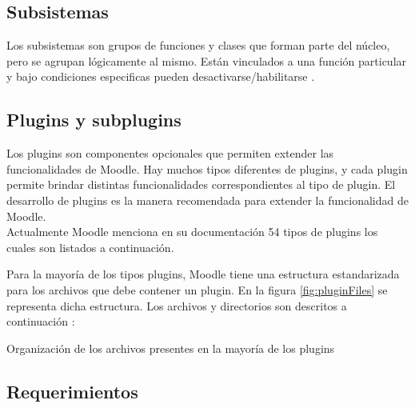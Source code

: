     \begin{multicols}{3}
        
    \end{multicols}


\subsection{Subsistemas}

 Los subsistemas son grupos de funciones y clases que forman parte del núcleo, pero se agrupan
 lógicamente al mismo. Están vinculados a una función particular y bajo condiciones especificas
 pueden desactivarse/habilitarse \cite{moodleComponets}.


\subsection{Plugins y subplugins}\label{subsec:plugins}

 Los plugins son componentes opcionales que permiten extender las funcionalidades de Moodle.
 Hay muchos tipos diferentes de plugins, y cada plugin permite brindar distintas funcionalidades
 correspondientes al tipo de plugin. El desarrollo de plugins es la manera recomendada para extender
 la funcionalidad de Moodle.\\

 \noindent Actualmente Moodle menciona en su documentación 54 tipos de plugins los cuales son
 listados a continuación.

    \begin{multicols}{3}
        
    \end{multicols}

 \clearpage

 \noindent Para la mayoría de los tipos plugins, Moodle tiene una estructura estandarizada para
 los archivos que debe contener un plugin. En la figura \ref{fig:pluginFiles} se representa dicha
 estructura. Los archivos y directorios son descritos a continuación \cite{moodlePluginfiles}:

        {Organización de los archivos presentes en la mayoría de los plugins}

    \begin{quote}
        
    \end{quote}

\subsection{Requerimientos}

